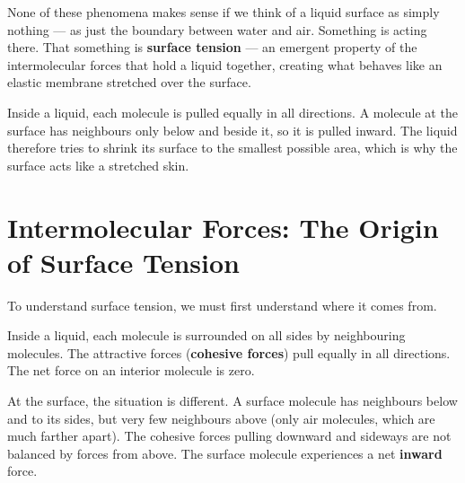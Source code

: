 None of these phenomena makes sense if we think of
a liquid surface as simply nothing --- as just
the boundary between water and air. Something is
acting there. That something is \textbf{surface tension}
--- an emergent property of the intermolecular forces
that hold a liquid together, creating what behaves
like an elastic membrane stretched over the surface.

Inside a liquid, each molecule is pulled equally in all directions.
A molecule at the surface has neighbours only below and beside it,
so it is pulled inward. The liquid therefore tries to shrink its
surface to the smallest possible area, which is why the surface acts
like a stretched skin.

\section{Intermolecular Forces: The Origin of Surface
Tension}

To understand surface tension, we must first
understand where it comes from.

Inside a liquid, each molecule is surrounded on
all sides by neighbouring molecules. The attractive
forces (\textbf{cohesive forces}) pull equally in
all directions. The net force on an interior molecule
is zero.

At the surface, the situation is different. A surface
molecule has neighbours below and to its sides, but
very few neighbours above (only air molecules, which
are much farther apart). The cohesive forces pulling
downward and sideways are not balanced by forces from
above. The surface molecule experiences a net
\textbf{inward} force.

